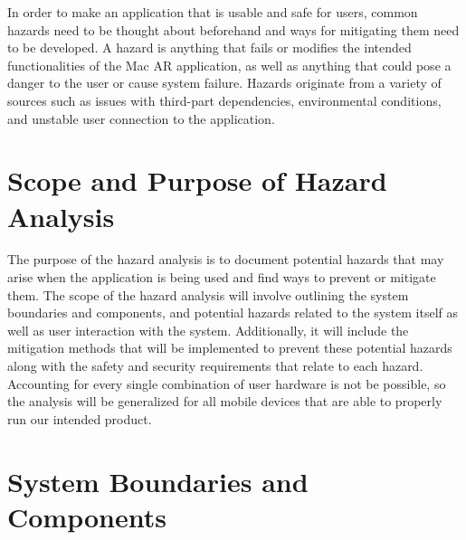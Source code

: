\documentclass{article}
\begin{document}

In order to make an application that is usable and safe for users, common hazards need to be thought about beforehand and ways for mitigating them need to be developed. A hazard is anything that fails or modifies the intended functionalities of the Mac AR application, as well as anything that could pose a danger to the user or cause system failure. Hazards originate from a variety of sources such as issues with third-part dependencies, environmental conditions, and unstable user connection to the application. 

\section{Scope and Purpose of Hazard Analysis}
The purpose of the hazard analysis is to document potential hazards that may arise when the application is being used and find ways to prevent or mitigate them. The scope of the hazard analysis will involve outlining the system boundaries and components, and potential hazards related to the system itself as well as user interaction with the system. Additionally, it will include the mitigation methods that will be implemented to prevent these potential hazards along with the safety and security requirements that relate to each hazard. Accounting for every single combination of user hardware is not be possible, so the analysis will be generalized for all mobile devices that are able to properly run our intended product.


\section{System Boundaries and Components}
\end{document}
